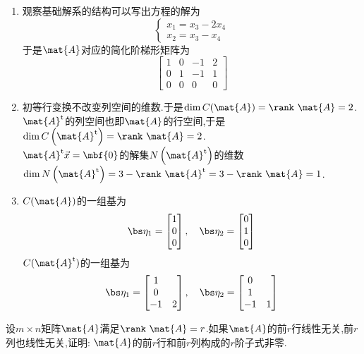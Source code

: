 \documentclass{ctexart}
\begin{document}
\begin{solution}
\begin{enumerate}[label=\tbf{(\arabic*)},topsep=0pt,parsep=0pt,itemsep=0pt,partopsep=0pt]
    \item 观察基础解系的结构可以写出方程的解为
    \[\left\{\begin{array}{l}
        x_1=x_3-2x_4\\
        x_2=x_3-x_4
    \end{array}\right.\]
    于是$\mat{A}$对应的简化阶梯形矩阵为
    \[\begin{bmatrix}
        1&0&-1&2\\
        0&1&-1&1\\
        0&0&0&0
    \end{bmatrix}\]
    \item 初等行变换不改变列空间的维数.于是$\dim C(\mat{A})=\rank\ \mat{A}=2$.\\
    $\mat{A}^{\text{t}}$的列空间也即$\mat{A}$的行空间,于是$\dim C\left(\mat{A}^{\text{t}}\right)=\rank\ \mat{A}=2$.\\
    $\mat{A}^{\text{t}}\vec{x}=\mbf{0}$的解集$N\left(\mat{A}^{\text{t}}\right)$的维数$\dim N\left(\mat{A}^{\text{t}}\right)=3-\rank\ \mat{A}^{\text{t}}=3-\rank\ \mat{A}=1$.
    \item $C(\mat{A})$的一组基为
    \[\bs\eta_1=\begin{bmatrix}
        1\\0\\0
    \end{bmatrix},\quad\bs\eta_2=\begin{bmatrix}
        0\\1\\0
    \end{bmatrix}\]
    $C(\mat{A}^{\text{t}})$的一组基为
    \[\bs\eta_1=\begin{bmatrix}
        1\\0\\-1&2
    \end{bmatrix},\quad\bs\eta_2=\begin{bmatrix}
        0\\1\\-1&1
    \end{bmatrix}\]
\end{enumerate}
\end{solution}
\begin{homework}[5(10')]
    设$m\times n$矩阵$\mat{A}$满足$\rank\ \mat{A}=r$.如果$\mat{A}$的前$r$行线性无关,前$r$列也线性无关,证明: $\mat{A}$的前$r$行和前$r$列构成的$r$阶子式非零.
\end{homework}
\end{document}
